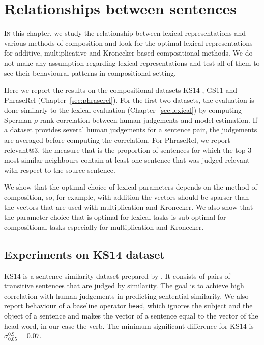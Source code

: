 \chapter{Relationships between sentences}
\label{sec:sentential}

\lettrine[lines=5,loversize=0.25]{I}{n} this chapter, we study the relationship between lexical representations and various methods of composition and look for the optimal lexical representations for additive, multiplicative and Kronecker-based compositional methods.\footnotemark{} We do not make any assumption regarding lexical representations and test all of them to see their behavioural patterns in compositional setting.


Here we report the results on the compositional datasets KS14 \cite{kartsadrqpl2014}, GS11 \cite{Grefenstette:2011:ETV:2140490.2140497} and PhraseRel (Chapter~\ref{sec:phraserel}). For the first two datasets, the evaluation is done similarly to the lexical evaluation (Chapter~\ref{sec:lexical}) by computing Sperman-$\rho$ rank correlation between human judgements and model estimation. If a dataset provides several human judgements for a sentence pair, the judgements are averaged before computing the correlation. For PhraseRel, we report relevant@3, the measure that is the proportion of sentences for which the top-3 most similar neighbours contain at least one sentence that was judged relevant with respect to the source sentence.

We show that the optimal choice of lexical parameters depends on the method of composition, so, for example, with addition the vectors should be sparser than the vectors that are used with multiplication and Kronecker. We also show that the parameter choice that is optimal for lexical tasks is sub-optimal for compositional tasks especially for multiplication and Kronecker.

\section{Experiments on KS14 dataset}
\label{sec:ks14}

KS14 is a sentence similarity dataset prepared by \citet{kartsadrqpl2014}. It consists of pairs of transitive sentences that are judged by similarity. The goal is to achieve high correlation with human judgements in predicting sentential similarity. We also report behaviour of a baseline operator \texttt{head}, which ignores the subject and the object of a sentence and makes the vector of a sentence equal to the vector of the head word, in our case the verb. The minimum significant difference for KS14 is $\sigma^{0.9}_{0.05} = 0.07$.

